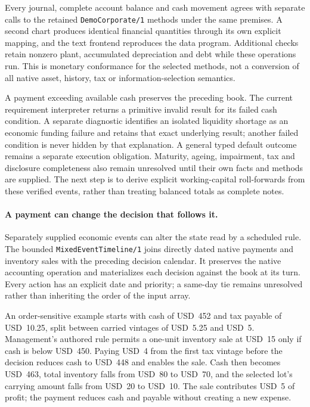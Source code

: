 Every journal, complete account balance and cash movement agrees with separate
calls to the retained \texttt{DemoCorporate/1} methods under the same premises.
A second chart produces identical financial quantities through its own explicit
mapping, and the text frontend reproduces the data program. Additional checks
retain nonzero plant, accumulated depreciation and debt while these operations
run. This is monetary conformance for the selected methods, not a conversion of
all native asset, history, tax or information-selection semantics.

A payment exceeding available cash preserves the preceding book. The current
requirement interpreter returns a primitive invalid result for its failed cash
condition. A separate diagnostic identifies an isolated liquidity shortage as
an economic funding failure and retains that exact underlying result; another
failed condition is never hidden by that explanation. A general typed default
outcome remains a separate execution obligation. Maturity, ageing, impairment,
tax and disclosure completeness also remain unresolved until their own facts and
methods are supplied. The next step is to derive explicit working-capital
roll-forwards from these verified events, rather than treating balanced totals
as complete notes.


\paragraph{A payment can change the decision that follows it.}
Separately supplied economic events can alter the state read by a scheduled
rule. The bounded \texttt{MixedEventTimeline/1} joins directly dated native
payments and inventory sales with the preceding decision calendar. It preserves
the native accounting operation and materializes each decision against the book
at its turn. Every action has an explicit date and priority; a same-day tie
remains unresolved rather than inheriting the order of the input array.

An order-sensitive example starts with cash of USD~452 and tax payable of
USD~10.25, split between carried vintages of USD~5.25 and USD~5. Management's
authored rule permits a one-unit inventory sale at USD~15 only if cash is below
USD~450. Paying USD~4 from the first tax vintage before the decision reduces
cash to USD~448 and enables the sale. Cash then becomes USD~463, total inventory
falls from USD~80 to USD~70, and the selected lot's carrying amount falls from
USD~20 to USD~10. The sale contributes USD~5 of profit; the payment reduces cash
and payable without creating a new expense.


